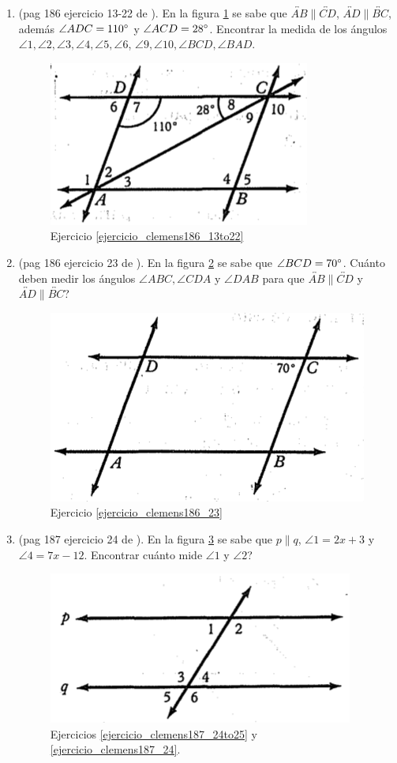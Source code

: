 \begin{enumerate}
	\item  \label{ejercicio_clemens186_13to22} (pag 186 ejercicio 13-22 de \cite{clemens}). En la figura \ref{clemens186_13to22} se sabe que $\overleftrightarrow{AB} \parallel \overleftrightarrow{CD}$, $\overleftrightarrow{AD} \parallel \overleftrightarrow{BC}$, además $\angle ADC= 110\degree$ y $\angle ACD= 28\degree$. Encontrar la medida de los ángulos $\angle 1, \angle 2, \angle 3, \angle 4, \angle 5, \angle 6$, $ \angle 9, \angle 10, \angle BCD, \angle BAD$.
	\begin{figure}[H]
		\centering
		\includegraphics[width=0.5\linewidth]{Geometria/imgs/clemens186_13to22}
		\caption{Ejercicio \ref{ejercicio_clemens186_13to22}}
		\label{clemens186_13to22}
	\end{figure}
	
	\item  \label{ejercicio_clemens186_23} (pag 186 ejercicio 23 de \cite{clemens}). En la figura \ref{clemens186_23} se sabe que $\angle BCD =70\degree$. Cuánto deben medir los ángulos $\angle ABC, \angle CDA$ y $\angle DAB$ para que $\overleftrightarrow{AB} \parallel \overleftrightarrow{CD}$ y  $\overleftrightarrow{AD} \parallel \overleftrightarrow{BC}$?
	\begin{figure}[H]
		\centering
		\includegraphics[width=0.4\linewidth]{Geometria/imgs/clemens186_23}
		\caption{Ejercicio \ref{ejercicio_clemens186_23}}
		\label{clemens186_23}
	\end{figure}
	
	\item  \label{ejercicio_clemens187_24to25} (pag 187 ejercicio 24 de \cite{clemens}). En la figura \ref{clemens187_24to25} se sabe que $p\parallel q$, $\angle 1 =2x+3$ y $\angle 4 = 7x-12$. Encontrar cuánto mide $\angle 1$ y $\angle 2$?
	\begin{figure}[H]
		\centering
		\includegraphics[width=0.4\linewidth]{Geometria/imgs/clemens187_24to25}
		\caption{Ejercicios \ref{ejercicio_clemens187_24to25} y \ref{ejercicio_clemens187_24}.}
		\label{clemens187_24to25}
	\end{figure}
	

\end{enumerate}
